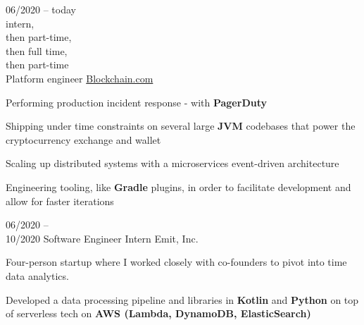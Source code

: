 \begin{entrylist}
    \entry
    {
        06/2020 -- today\\\footnotesize{intern,\\then part-time, \\then full time, \\then part-time}\\
    }
    {Platform engineer}
    {\href{https://blockchain.com/about}{Blockchain.com}}
    {
        Performing production incident response - with \textbf{PagerDuty}

        \para
        Shipping under time constraints on several large \textbf{JVM} codebases that power the
        cryptocurrency exchange and wallet

        \para
        Scaling up distributed systems with a microservices event-driven architecture

        \para
        Engineering tooling, like \textbf{Gradle} plugins, in order to facilitate development
    and allow for faster iterations
    }
    \entry
    {06/2020 -- \\ 10/2020}
    {Software Engineer Intern}
    {Emit, Inc.}
    {
        Four-person startup where I worked closely with co-founders to pivot into time data
        analytics.

        \para
        Developed a data processing pipeline and libraries in \textbf{Kotlin} and
        \textbf{Python} on top of serverless tech on \textbf{AWS (Lambda, DynamoDB,
            ElasticSearch)}
    }
\end{entrylist}

